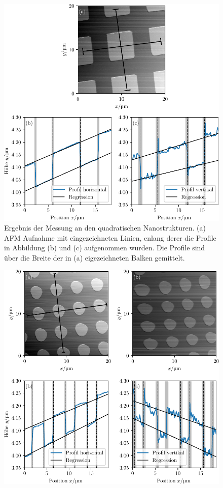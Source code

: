 \begin{figure}
  \centering
  \includegraphics[scale = 1]{../analysis/data/nanostruktur_quadrate/quadrate_profile.pdf}
  \caption{Ergebnis der Messung an den quadratischen Nanostrukturen. (a) AFM Aufnahme mit eingezeichneten
  Linien, enlang derer die Profile in Abbildung (b) und (c) aufgenommen wurden. Die Profile sind
  über die Breite der in (a) eigezeichneten Balken gemittelt.}
  \label{fig: quadrate_profil}
\end{figure}



\begin{figure}
  \centering
  \includegraphics[scale = 1]{../analysis/data/nanostruktur_kreise/kreise_profile.pdf}
  \caption{}
  \label{fig: kreise_profil}
\end{figure}

